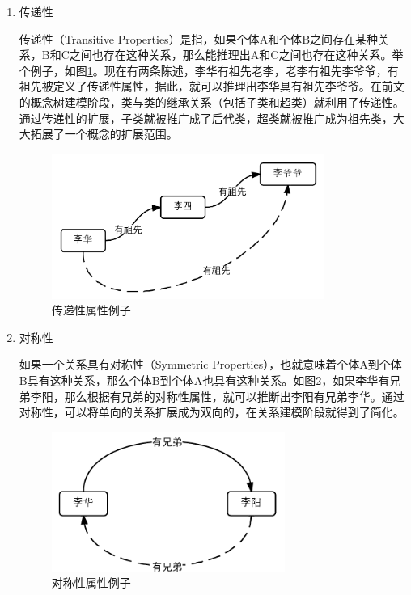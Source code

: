 \documentclass[12pt,a4paper]{article}
\newcommand{\wuhao}{\fontsize{10.5pt}{\baselineskip}\selectfont}
\begin{document}
\begin{enumerate}[(1)]
		\item 传递性

	\quad \quad 传递性（{\Times Transitive Properties}）是指，如果个体{\Times A}和个体{\Times B}之间存在某种关系，{\Times B}和{\Times C}之间也存在这种关系，那么能推理出{\Times A}和{\Times C}之间也存在这种关系。举个例子，如图\ref{fig:传递性属性例子}。现在有两条陈述，李华有祖先老李，老李有祖先李爷爷，有祖先被定义了传递性属性，据此，就可以推理出李华具有祖先李爷爷。在前文的概念树建模阶段，类与类的继承关系（包括子类和超类）就利用了传递性。通过传递性的扩展，子类就被推广成了后代类，超类就被推广成为祖先类，大大拓展了一个概念的扩展范围。
		
	\begin{figure}[htbp] 
	\centering\includegraphics[width=3.5in]{fig/transitivePropertyExample.png} 
	\caption{\wuhao 传递性属性例子}\label{fig:传递性属性例子} 
	\end{figure}	
	
		\item 对称性

	\quad \quad 如果一个关系具有对称性（{\Times Symmetric Properties}），也就意味着个体{\Times A}到个体{\Times B}具有这种关系，那么个体{\Times B}到个体{\Times A}也具有这种关系。如图\ref{fig:对称性属性例子}，如果李华有兄弟李阳，那么根据有兄弟的对称性属性，就可以推断出李阳有兄弟李华。通过对称性，可以将单向的关系扩展成为双向的，在关系建模阶段就得到了简化。
	\begin{figure}[htbp] 
	\centering\includegraphics[width=3in]{fig/SymmetricPropertyExample.png} 
	\caption{\wuhao 对称性属性例子}\label{fig:对称性属性例子} 
	\end{figure}	
	

\end{enumerate}
\end{document}
